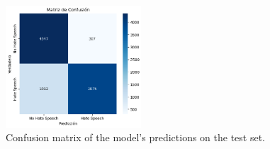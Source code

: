 \begin{figure}[H]
    \centering
    \includegraphics[width=0.45\textwidth]{images/matrixOfConfusion.png}
    \caption{Confusion matrix of the model's predictions on the test set.}
    \label{fig:confusion_matrix}
\end{figure}
